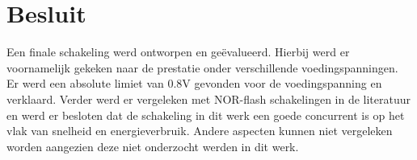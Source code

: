 \section{Besluit}
Een finale schakeling werd ontworpen en geëvalueerd. Hierbij werd er voornamelijk gekeken naar de prestatie onder verschillende voedingspanningen. Er werd een absolute limiet van 0.8V gevonden voor de voedingspanning en verklaard. Verder werd er vergeleken met NOR-flash schakelingen in de literatuur en werd er besloten dat de schakeling in dit werk een goede concurrent is op het vlak van snelheid en energieverbruik. Andere aspecten kunnen niet vergeleken worden aangezien deze niet onderzocht werden in dit werk.